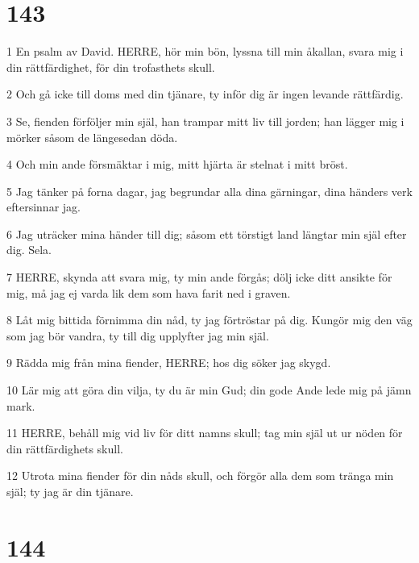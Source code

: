 \chapter{143}

\par 1 En psalm av David. HERRE, hör min bön, lyssna till min åkallan, svara mig i din rättfärdighet, för din trofasthets skull.
\par 2 Och gå icke till doms med din tjänare, ty inför dig är ingen levande rättfärdig.
\par 3 Se, fienden förföljer min själ, han trampar mitt liv till jorden; han lägger mig i mörker såsom de längesedan döda.
\par 4 Och min ande försmäktar i mig, mitt hjärta är stelnat i mitt bröst.
\par 5 Jag tänker på forna dagar, jag begrundar alla dina gärningar, dina händers verk eftersinnar jag.
\par 6 Jag uträcker mina händer till dig; såsom ett törstigt land längtar min själ efter dig. Sela.
\par 7 HERRE, skynda att svara mig, ty min ande förgås; dölj icke ditt ansikte för mig, må jag ej varda lik dem som hava farit ned i graven.
\par 8 Låt mig bittida förnimma din nåd, ty jag förtröstar på dig. Kungör mig den väg som jag bör vandra, ty till dig upplyfter jag min själ.
\par 9 Rädda mig från mina fiender, HERRE; hos dig söker jag skygd.
\par 10 Lär mig att göra din vilja, ty du är min Gud; din gode Ande lede mig på jämn mark.
\par 11 HERRE, behåll mig vid liv för ditt namns skull; tag min själ ut ur nöden för din rättfärdighets skull.
\par 12 Utrota mina fiender för din nåds skull, och förgör alla dem som tränga min själ; ty jag är din tjänare.

\chapter{144}

